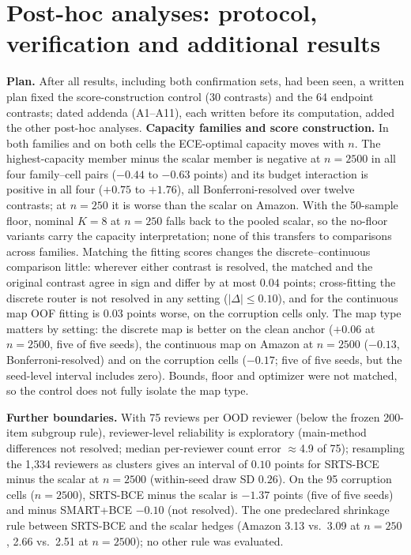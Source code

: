 \documentclass[sigconf,anonymous,review]{acmart}
\begin{document}
\section{Post-hoc analyses: protocol, verification and additional results}
\label{app:posthoc}
\textbf{Plan.} After all results, including both confirmation sets, had
been seen, a written plan fixed the score-construction control (30
contrasts) and the 64 endpoint contrasts; dated addenda (A1--A11), each
written before its computation, added the other post-hoc analyses. \textbf{Capacity families and score
construction.} In both families and on both cells the ECE-optimal
capacity moves with $n$. The highest-capacity member minus the scalar
member is negative at $n{=}2500$ in all four family--cell pairs ($-0.44$
to $-0.63$ points) and its budget interaction is positive in all four
($+0.75$ to $+1.76$), all Bonferroni-resolved over twelve contrasts; at
$n{=}250$ it is worse than the scalar on Amazon. With the 50-sample
floor, nominal $K{=}8$ at $n{=}250$ falls back to the pooled scalar, so
the no-floor variants carry the capacity interpretation; none of this
transfers to comparisons across families. Matching the fitting scores
changes the discrete--continuous comparison little: wherever either
contrast is resolved, the matched and the original contrast agree in sign
and differ by at most $0.04$ points; cross-fitting the discrete router is
not resolved in any setting ($|\Delta|\le0.10$), and for the continuous
map OOF fitting is $0.03$ points worse, on the corruption cells only. The
map type matters by setting: the discrete map is better on the clean
anchor ($+0.06$ at $n{=}2500$, five of five seeds), the continuous map on
Amazon at $n{=}2500$ ($-0.13$, Bonferroni-resolved) and on the corruption
cells ($-0.17$; five of five seeds, but the seed-level interval includes
zero). Bounds, floor and optimizer were not matched, so the control does
not fully isolate the map type.

\textbf{Further boundaries.} With 75 reviews per OOD reviewer (below the
frozen 200-item subgroup rule), reviewer-level reliability is exploratory
(main-method differences not resolved; median per-reviewer count error
$\approx$4.9 of 75); resampling the 1{,}334 reviewers as clusters gives an
interval of $0.10$ points for SRTS-BCE minus the scalar at $n{=}2500$
(within-seed draw SD $0.26$). On the 95 corruption cells ($n{=}2500$),
SRTS-BCE minus the scalar is $-1.37$ points (five of five seeds) and minus
SMART+BCE $-0.10$ (not resolved). The one predeclared shrinkage rule
between SRTS-BCE and the scalar hedges (Amazon 3.13 vs.\ 3.09 at
$n{=}250$, 2.66 vs.\ 2.51 at $n{=}2500$); no other rule was evaluated.
\end{document}
